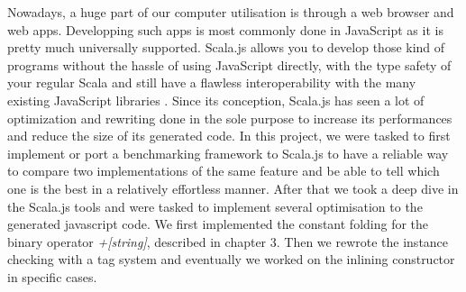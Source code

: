 Nowadays, a huge part of our computer utilisation is through a web browser and
web apps.
Developping such apps is most commonly done in JavaScript as it is pretty much
universally supported. Scala.js allows you to develop those kind of programs
without the hassle of using JavaScript directly, with the type safety of your
regular Scala and still have a flawless interoperability with the many existing
JavaScript libraries \cite{scalajsInterop}.
Since its conception, Scala.js has seen a lot of optimization and rewriting
done in the sole purpose to increase its performances and reduce the size of
its generated code.
In this project, we were tasked to first implement or port a benchmarking
framework to Scala.js to have a reliable way to compare two implementations of
the same feature and be able to tell which one is the best in a relatively
effortless manner.
After that we took a deep dive in the Scala.js tools and were tasked to
implement several optimisation to the generated javascript code. We first
implemented the constant folding for the binary operator \emph{+[string]},
described in chapter 3. Then we rewrote the instance checking with a tag system
and eventually we worked on the inlining constructor in specific cases.